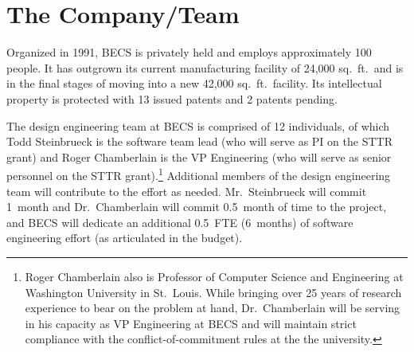 \section{The Company/Team}
\label{sec:team}

%

Organized in 1991, BECS is privately held and employs approximately 100
people. It has outgrown its current
manufacturing facility of 24,000 sq.~ft.\ and is in the final stages of
moving into a new 42,000 sq.~ft.\ facility.
Its intellectual property is protected with 13 issued patents and
2 patents pending.

The design engineering team at BECS is comprised of 12 individuals, of
which Todd Steinbrueck is the software team lead (who will serve as
PI on the STTR grant) and Roger Chamberlain is the VP Engineering (who
will serve as senior personnel on the STTR grant).\footnote{Roger Chamberlain
also is Professor of Computer Science and Engineering at Washington
University in St.~Louis. While bringing over 25 years of research
experience to bear on the problem at hand, Dr.~Chamberlain will be
serving in his capacity as VP Engineering at BECS and will maintain
strict compliance with the conflict-of-commitment rules at the the university.}
Additional members of the design engineering team will contribute to
the effort as needed. Mr.~Steinbrueck will commit 1~month and Dr.~Chamberlain
will commit 0.5~month of time to the project,
and BECS will dedicate an additional
0.5~FTE (6~months) of software engineering effort
(as articulated in the budget).

